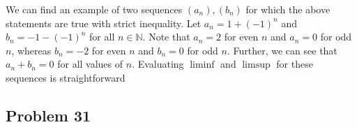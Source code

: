 \documentclass[11pt]{article}
\newcommand{\N}{\mathbb{N}}
\begin{document}
We can find an example of two sequences $(a_n), (b_n)$ for which the above statements
are true with strict inequality. Let $a_n = 1+(-1)^n$ and $b_n = -1-(-1)^n$
for all $n\in\N$. Note that $a_n=2$ for even $n$ and $a_n=0$ for odd $n$, whereas
$b_n = -2$ for even $n$ and $b_n=0$ for odd $n$. Further, we can see that
$a_n+b_n=0$ for all values of $n$. Evaluating $\liminf$ and $\limsup$ for these
sequences is straightforward

\subsection*{Problem 31}
\end{document}
